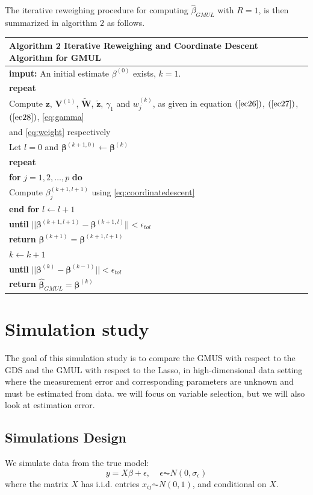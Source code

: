 \documentclass[a4paper,12pt,openany]{report}
\theoremstyle{plain}
\theoremstyle{plain}
\theoremstyle{plain}
\theoremstyle{plain}
\theoremstyle{plain}
\theoremstyle{plain}
\theoremstyle{plain}
\theoremstyle{plain}
\theoremstyle{plain}
\theoremstyle{plain}
\theoremstyle{plain}
\theoremstyle{plain}
\begin{document}
The iterative reweighing procedure for computing $\hat{\beta}_{GMUL}$ with $R=1$, is then summarized in algorithm $2$ as follows.
\begin{table}
	\centering
	\begin{tabular}{l}
		\hline
		\textbf{Algorithm 2} Iterative Reweighing and Coordinate Descent Algorithm for GMUL\\
		\hline
		\textbf{imput:} An initial estimate $\beta^{(0)}$ exists, $k=1$.\\
		\textbf{repeat}\\
		Compute $\mathbf{z}$, $\mathbf{V}^{(1)}$, $\mathbf{\tilde{W}}$, $\mathbf{\tilde{z}}$, $\gamma_1$ and $w_j^{(k)}$, as given in equation $(\ref{ec26})$, $(\ref{ec27})$,  $(\ref{ec28})$, \eqref{eq:gamma} \\
		 and \eqref{eq:weight} respectively\\
		Let $l=0$ and $\mathbf{\beta}^{(k+1,0)}\leftarrow \mathbf{\beta}^{(k)}$\\
		\textbf{repeat}\\
		\textbf{for} $j=1,2,\ldots,p$ \textbf{do}\\
		Compute $\beta_j^{(k+1,l+1)}$ using \eqref{eq:coordinatedescent}\\
		\textbf{end for}
		$l\leftarrow l+1$\\
		\textbf{until} $||\mathbf{\beta}^{(k+1,l+1)}-\mathbf{\beta}^{(k+1,l)}|| <\epsilon_{tol}$\\
		\textbf{return} $\mathbf{\beta}^{(k+1)} = \mathbf{\beta}^{(k+1,l+1)}$\\
		$k\leftarrow k+1$\\
		\textbf{until} $||\mathbf{\beta}^{(k)}-\mathbf{\beta}^{(k-1)}|| <\epsilon_{tol}$\\
		\textbf{return} $\mathbf{\hat{\beta}}_{GMUL}=\mathbf{\beta}^{(k)}$\\
		\hline
	\end{tabular}
\end{table}
\chapter{Simulation study}
The goal of this simulation study is to compare the GMUS with respect to the GDS and the GMUL with respect to the Lasso, in high-dimensional data setting where the measurement error and corresponding parameters are unknown and must be estimated from data. we will focus on variable selection, but we will also look at estimation error.
\section{Simulations Design}
We simulate data from the true model:
\begin{equation}
y=X\beta +\epsilon, \ \ \ \ \ \epsilon\AC N(0,\sigma_{\epsilon})
\end{equation}
where the matrix $X$ has i.i.d. entries $x_{ij}\AC N(0,1)$, and conditional on $X$.
\end{document}
